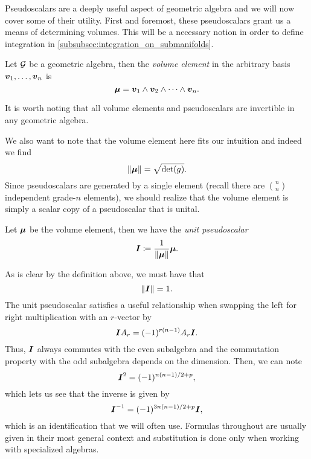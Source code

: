 Pseudoscalars are a deeply useful aspect of geometric algebra and we will now cover some of their utility. First and foremost, these pseudoscalars grant us a means of determining volumes. This will be a necessary notion in order to define integration in \cref{subsubsec:integration_on_submanifolds}.
\begin{definition}
Let $\mathcal{G}$ be a geometric algebra, then the \emph{volume element} in the arbitrary basis $\boldsymbol{v}_1,\dots,\boldsymbol{v}_n$ is 
\begin{equation}
\boldsymbol{\mu}=\boldsymbol{v}_1 \wedge \boldsymbol{v}_2 \wedge \cdots \wedge \boldsymbol{v}_n.
\end{equation}
\end{definition}
It is worth noting that all volume elements and pseudoscalars are invertible in any geometric algebra. 

We also want to note that the volume element here fits our intuition and indeed we find
\begin{equation}
\label{eq:pseudoscalar_norm}
\|\boldsymbol{\mu}\| = \sqrt{\det(g)}.
\end{equation}
Since pseudoscalars are generated by a single element (recall there are ${n \choose n}$ independent grade-$n$ elements), we should realize that the volume element is simply a scalar copy of a pseudoscalar that is unital.
\begin{definition}
Let $\boldsymbol{\mu}$ be the volume element, then we have the \emph{unit pseudoscalar}
\begin{equation}
\boldsymbol{I} \coloneqq \frac{1}{\|\boldsymbol{\mu}\|} \boldsymbol{\mu}.
\end{equation}
\end{definition}
As is clear by the definition above, we must have that
\begin{equation}
\|\boldsymbol{I}\| = 1.
\end{equation}
The unit pseudoscalar satisfies a useful relationship when swapping the left for right multiplication with an $r$-vector by
\begin{equation}
\boldsymbol{I} A_r = (-1)^{r(n-1)} A_r \boldsymbol{I}.
\end{equation}
Thus, $\boldsymbol{I}$ always commutes with the even subalgebra and the commutation property with the odd subalgebra depends on the dimension. Then, we can note
\begin{equation}
\boldsymbol{I}^2 = (-1)^{n(n-1)/2+p},
\end{equation}
which lets us see that the inverse is given by
\begin{equation}
\boldsymbol{I}^{-1} = (-1)^{3n(n-1)/2+p} \boldsymbol{I},
\end{equation}
which is an identification that we will often use. Formulas throughout are usually given in their most general context and substitution is done only when working with specialized algebras.  

